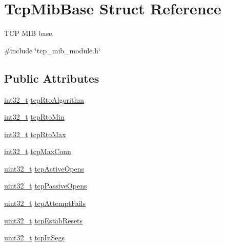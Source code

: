 \hypertarget{structTcpMibBase}{}\section{Tcp\+Mib\+Base Struct Reference}
\label{structTcpMibBase}


T\+CP M\+IB base.  




{\ttfamily \#include \char`\"{}tcp\+\_\+mib\+\_\+module.\+h\char`\"{}}

\subsection*{Public Attributes}
\begin{DoxyCompactItemize}
\item 
\hyperlink{stdint_8h_ab1967d8591af1a4e48c37fd2b0f184d0}{int32\+\_\+t} \hyperlink{structTcpMibBase_a071bca65cede81d7e95dd6aa1d389d33}{tcp\+Rto\+Algorithm}
\item 
\hyperlink{stdint_8h_ab1967d8591af1a4e48c37fd2b0f184d0}{int32\+\_\+t} \hyperlink{structTcpMibBase_a96d086f1316ea9a782b6c919962203f6}{tcp\+Rto\+Min}
\item 
\hyperlink{stdint_8h_ab1967d8591af1a4e48c37fd2b0f184d0}{int32\+\_\+t} \hyperlink{structTcpMibBase_a275ff3ea426d35f2a47ec1d03b62ff35}{tcp\+Rto\+Max}
\item 
\hyperlink{stdint_8h_ab1967d8591af1a4e48c37fd2b0f184d0}{int32\+\_\+t} \hyperlink{structTcpMibBase_a398130f11e3b8907959c26935837932e}{tcp\+Max\+Conn}
\item 
\hyperlink{stdint_8h_a435d1572bf3f880d55459d9805097f62}{uint32\+\_\+t} \hyperlink{structTcpMibBase_a1a0cc6f5cbef4ad3c3b4fd04d35ad4b5}{tcp\+Active\+Opens}
\item 
\hyperlink{stdint_8h_a435d1572bf3f880d55459d9805097f62}{uint32\+\_\+t} \hyperlink{structTcpMibBase_a911158b84c07b2df6dea98ca3dd67310}{tcp\+Passive\+Opens}
\item 
\hyperlink{stdint_8h_a435d1572bf3f880d55459d9805097f62}{uint32\+\_\+t} \hyperlink{structTcpMibBase_a0633da2571e01256a93178192113bb13}{tcp\+Attempt\+Fails}
\item 
\hyperlink{stdint_8h_a435d1572bf3f880d55459d9805097f62}{uint32\+\_\+t} \hyperlink{structTcpMibBase_a1f6727e57c7a4a57e725d8d1ef19966b}{tcp\+Estab\+Resets}
\item 
\hyperlink{stdint_8h_a435d1572bf3f880d55459d9805097f62}{uint32\+\_\+t} \hyperlink{structTcpMibBase_aebc7aae4ace479bff924640193c0534f}{tcp\+In\+Segs}

\end{DoxyCompactItemize}
